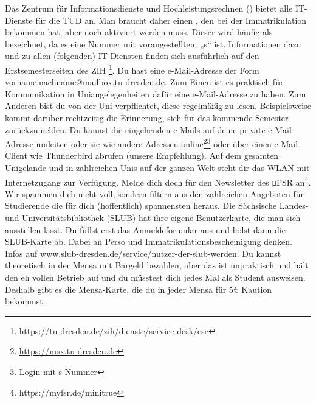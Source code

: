 \documentclass{scrartcl}
\begin{document}
\begin{description}
   Das Zentrum für Informationsdienste und Hochleistungsrechnen ()
    bietet alle IT-Dienste für die TUD an. Man braucht daher einen , den bei der
    Immatrikulation bekommen hat, aber noch aktiviert werden muss.
    Dieser wird häufig als  bezeichnet, da es eine Nummer mit vorangestelltem „s“ ist.
    Informationen dazu und zu allen (folgenden) IT-Diensten finden sich ausführlich auf den
    Erstsemesterseiten des ZIH \footnote{\url{https://tu-dresden.de/zih/dienste/service-desk/ese}\label{zihurl}}.
   Du hast eine e-Mail-Adresse der Form \url{vorname.nachname@mailbox.tu-dresden.de}.
    Zum Einen ist es praktisch für Kommunikation in Uniangelegenheiten dafür eine e-Mail-Adresse zu haben.
    Zum Anderen bist du von der Uni verpflichtet, diese regelmäßig zu lesen.
    Beispielsweise kommt darüber rechtzeitig die Erinnerung, sich für das kommende Semester zurückzumelden.
    Du kannst die eingehenden e-Mails auf deine private e-Mail-Adresse umleiten oder sie wie andere Adressen
    online\footnote{\url{https://msx.tu-dresden.de}}\footnote{Login mit s-Nummer\label{snr}} oder über einen e-Mail-Client wie Thunderbird abrufen (unsere Empfehlung).
   Auf dem gesamten Unigelände und in zahlreichen Unis auf der ganzen Welt steht dir
    das WLAN  mit Internetzugang zur Verfügung.
   Melde dich doch für den Newsletter des μFSR an\footnote{https://myfsr.de/minitrue}.
    Wir spammen dich nicht voll, sondern
    filtern aus den zahlreichen Angeboten für Studierende die für dich (hoffentlich) spannensten heraus.
   Die Sächsische Landes- und Universitätsbibliothek (SLUB) hat ihre eigene Benutzerkarte,
    die man sich ausstellen lässt. Du füllst erst das Anmeldeformular aus und holst dann die SLUB-Karte ab.
    Dabei an Perso und Immatrikulationsbescheinigung denken.
    Infos auf \url{www.slub-dresden.de/service/nutzer-der-slub-werden}.
   Du kannst theoretisch in der Mensa mit Bargeld bezahlen,
    aber das ist unpraktisch und hält den eh vollen Betrieb auf und
    du müsstest dich jedes Mal als Student ausweisen.
    Deshalb gibt es die Mensa-Karte,
    die du in jeder Mensa für 5€ Kaution bekommst.

\end{description}
\end{document}
